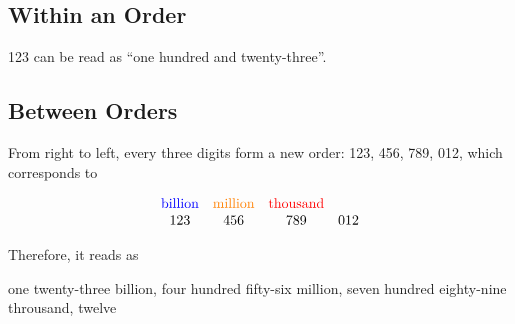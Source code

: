 \documentclass[12pt]{article}
\begin{document}
\subsection{Within an Order}

123 can be read as ``one hundred and twenty-three''.

\subsection{Between Orders}

From right to left, every three digits form a new order: 123{\color{blue}, }456{\color{orange}, }789{\color{red}, }012, which corresponds to

$$
\begin{array}{cccc}
    \text{\color{blue}billion} & \text{\color{orange}million} & \text{\color{red}thousand} & \\
    123 & 456 & 789 & 012
\end{array}
$$

Therefore, it reads as
\begin{center}
    one twenty-three billion, four hundred fifty-six million, seven hundred eighty-nine throusand, twelve
\end{center}
\end{document}
